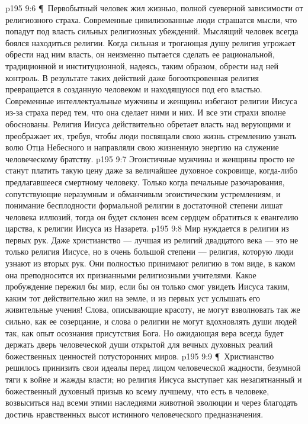\vs p195 9:6 \P\ Первобытный человек жил жизнью, полной суеверной зависимости от религиозного страха. Современные цивилизованные люди страшатся мысли, что попадут под власть сильных религиозных убеждений. Мыслящий человек всегда боялся находиться  религии. Когда сильная и трогающая душу религия угрожает обрести над ним власть, он неизменно пытается сделать ее рациональной, традиционной и институционной, надеясь, таким образом, обрести над ней контроль. В результате таких действий даже богооткровенная религия превращается в созданную человеком и находящуюся под его властью. Современные интеллектуальные мужчины и женщины избегают религии Иисуса из\hyp{}за страха перед тем, что она сделает  ними и  них. И все эти страхи вполне обоснованы. Религия Иисуса действительно обретает власть над верующими и преображает их, требуя, чтобы люди посвящали свою жизнь стремлению узнать волю Отца Небесного и направляли свою жизненную энергию на служение человеческому братству.
\vs p195 9:7 Эгоистичные мужчины и женщины просто не станут платить такую цену даже за величайшее духовное сокровище, когда\hyp{}либо предлагавшееся смертному человеку. Только когда печальные разочарования, сопутствующие неразумным и обманчивым эгоистическим устремлениям, и понимание бесплодности формальной религии в достаточной степени лишат человека иллюзий, тогда он будет склонен всем сердцем обратиться к евангелию царства, к религии Иисуса из Назарета.
\vs p195 9:8 Мир нуждается в религии из первых рук. Даже христианство --- лучшая из религий двадцатого века --- это не только религия  Иисусе, но в очень большой степени --- религия, которую люди узнают из вторых рук. Они полностью принимают религию в том виде, в каком она преподносится их признанными религиозными учителями. Какое пробуждение пережил бы мир, если бы он только смог увидеть Иисуса таким, каким тот действительно жил на земле, и из первых уст услышать его живительные учения! Слова, описывающие красоту, не могут взволновать так же сильно, как ее созерцание, и слова о религии не могут вдохновлять души людей так, как опыт осознания присутствия Бога. Но ожидающая вера всегда будет держать дверь человеческой души открытой для вечных духовных реалий божественных ценностей потусторонних миров.
\vs p195 9:9 \P\ Христианство решилось принизить свои идеалы перед лицом человеческой жадности, безумной тяги к войне и жажды власти; но религия Иисуса выступает как незапятнанный и божественный духовный призыв ко всему лучшему, что есть в человеке, возвыситься над всеми этими наследиями животной эволюции и через благодать достичь нравственных высот истинного человеческого предназначения.
